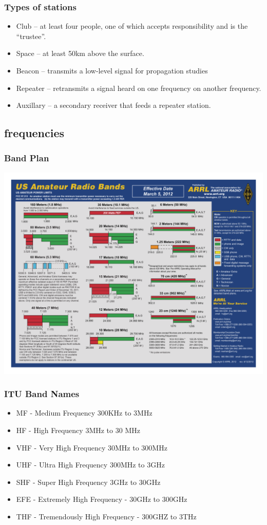 \documentclass[12pt]{beamer}
\begin{document}
\begin{frame}
\frametitle{Types of stations}
\begin{itemize}
\item Club – at least four  people, one of which accepts responsibility and is the “trustee”.
\item Space – at least 50km above the surface.
\item Beacon --  transmits a low-level signal for propagation studies
\item Repeater – retransmits  a signal heard on one frequency on another frequency.
\item Auxillary – a secondary receiver that feeds a repeater station.  
\end{itemize}
\end{frame}

\subsection{frequencies}

\begin{frame}
\frametitle{Band Plan}
\begin{center}
\includegraphics[width=\textwidth]{hambandscolor.pdf}
\end{center}
\end{frame}

\begin{frame}
\frametitle{ITU Band Names}
\begin{itemize}
\item MF - Medium Frequency 300KHz to 3MHz
\item HF - High Frequency 3MHz to 30 MHz
\item VHF - Very High Frequency 30MHz to 300MHz
\item UHF - Ultra High Frequency 300MHz to 3GHz
\item SHF - Super High Frequency 3GHz to 30GHz
\item EFE - Extremely High Frequency - 30GHz to 300GHz
\item THF - Tremendously High Frequency - 300GHZ to 3THz
\end{itemize}
\end{frame}
\end{document}
